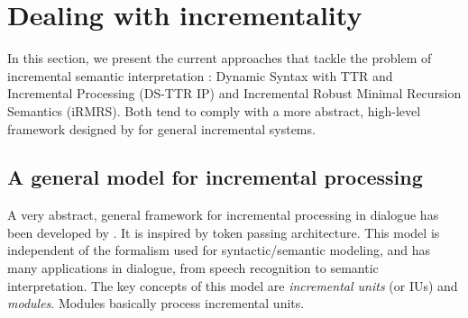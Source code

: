 \documentclass[11pt]{article}
\begin{document}

			
	\section{Dealing with incrementality}
		In this section, we present the current approaches that tackle the problem of incremental semantic interpretation : Dynamic Syntax with TTR and Incremental Processing (DS-TTR IP) and Incremental Robust Minimal Recursion Semantics (iRMRS). Both tend to comply with a more abstract, high-level framework designed by \cite{schlangen2009} for general incremental systems.
		\subsection{A general model for incremental processing}\label{iu_model}
			A very abstract, general framework for incremental processing in dialogue has been developed by \cite{schlangen2009}. It is inspired by \cite{young1989} token passing architecture. This model is independent of the formalism used for syntactic/semantic modeling, and has many applications in dialogue, from speech recognition to semantic interpretation. The key concepts of this model are \textit{incremental units} (or IUs) and \textit{modules}. Modules basically process incremental units.
\end{document}
